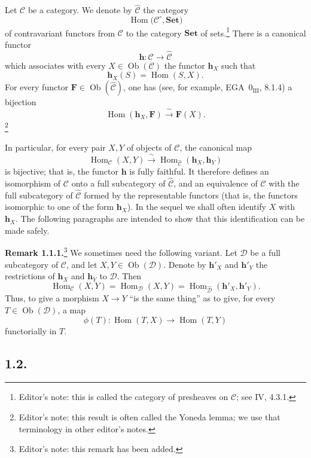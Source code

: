 Let \(\mathscr C\) be a category. We denote by \(\widehat{\mathscr C}\) the
category
\[
  \operatorname{Hom}\bigl(\mathscr C^{\circ},\mathbf{Set}\bigr)
\]
of contravariant functors from \(\mathscr C\) to the category \(\mathbf{Set}\)
of sets.\footnote{Editor's note: this is called the category of presheaves on
\(\mathscr C\); see IV, 4.3.1.} There is a canonical functor
\[
  \mathbf h:\mathscr C\longrightarrow\widehat{\mathscr C}
\]
which associates with every \(X\in\operatorname{Ob}(\mathscr C)\) the functor
\(\mathbf h_X\) such that
\[
  \mathbf h_X(S)=\operatorname{Hom}(S,X).
\]
For every functor \(\mathbf F\in\operatorname{Ob}(\widehat{\mathscr C})\),
one has (see, for example, EGA~\(0_{\mathrm{III}}\), 8.1.4) a bijection
\[
  \operatorname{Hom}(\mathbf h_X,\mathbf F)
    \xrightarrow{\ \sim\ } \mathbf F(X).
\]
\footnote{Editor's note: this result is often called the Yoneda lemma; we use
that terminology in other editor's notes.}

In particular, for every pair \(X,Y\) of objects of \(\mathscr C\), the
canonical map
\[
  \operatorname{Hom}_{\mathscr C}(X,Y)
    \xrightarrow{\ \sim\ }
  \operatorname{Hom}_{\widehat{\mathscr C}}
    (\mathbf h_X,\mathbf h_Y)
\]
is bijective; that is, the functor \(\mathbf h\) is fully faithful. It
therefore defines an isomorphism of \(\mathscr C\) onto a full subcategory of
\(\widehat{\mathscr C}\), and an equivalence of \(\mathscr C\) with the full
subcategory of \(\widehat{\mathscr C}\) formed by the representable functors
(that is, the functors isomorphic to one of the form \(\mathbf h_X\)). In the
sequel we shall often identify \(X\) with \(\mathbf h_X\). The following
paragraphs are intended to show that this identification can be made safely.

\medskip
\noindent\textbf{Remark 1.1.1.}\footnote{Editor's note: this remark has been
added.}
We sometimes need the following variant. Let \(\mathscr D\) be a full
subcategory of \(\mathscr C\), and let
\(X,Y\in\operatorname{Ob}(\mathscr D)\). Denote by \(\mathbf h'_X\) and
\(\mathbf h'_Y\) the restrictions of \(\mathbf h_X\) and \(\mathbf h_Y\) to
\(\mathscr D\). Then
\[
  \operatorname{Hom}_{\mathscr C}(X,Y)
  =\operatorname{Hom}_{\mathscr D}(X,Y)
  =\operatorname{Hom}_{\widehat{\mathscr D}}
      (\mathbf h'_X,\mathbf h'_Y).
\]
Thus, to give a morphism \(X\to Y\) ``is the same thing'' as to give, for
every \(T\in\operatorname{Ob}(\mathscr D)\), a map
\[
  \phi(T):\operatorname{Hom}(T,X)\longrightarrow\operatorname{Hom}(T,Y)
\]
functorially in \(T\).

\subsection*{1.2.}

